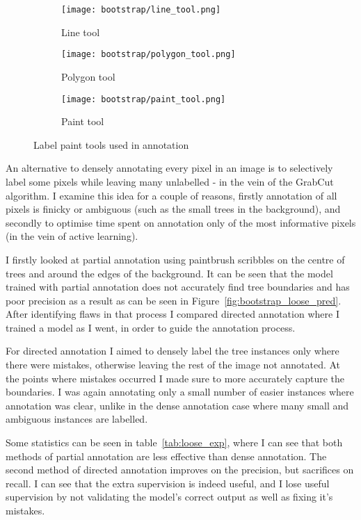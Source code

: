 \begin{figure}
\centering
\begin{subfigure}[t]{.15\textwidth}
  \centering
  \texttt{[image: bootstrap/line\_tool.png]}
  \caption{Line tool}
\end{subfigure}%
\begin{subfigure}[t]{.15\textwidth}
  \centering
  \texttt{[image: bootstrap/polygon\_tool.png]}
  \caption{Polygon tool}
\end{subfigure}%
\begin{subfigure}[t]{.15\textwidth}
  \centering
  \texttt{[image: bootstrap/paint\_tool.png]}
  \caption{Paint tool}
\end{subfigure}%

  \caption{Label paint tools used in annotation}
  \label{fig:bootstrap_tools}

\end{figure}



An alternative to densely annotating every pixel in an image is to selectively label some pixels while leaving many unlabelled - in the vein of the GrabCut algorithm. I examine this idea for a couple of reasons, firstly annotation of all pixels is finicky or ambiguous (such as the small trees in the background), and secondly to optimise time spent on annotation only of the most informative pixels (in the vein of active learning).

I firstly looked at partial annotation using paintbrush scribbles on the centre of trees and around the edges of the background. It can be seen that the model trained with partial annotation does not accurately find tree boundaries and has poor precision as a result as can be seen in Figure~\ref{fig:bootstrap_loose_pred}. After identifying flaws in that process I compared directed annotation where I trained a model as I went, in order to guide the annotation process.

For directed annotation I aimed to densely label the tree instances only where there were mistakes, otherwise leaving the rest of the image not annotated. At the points where mistakes occurred I made sure to more accurately capture the boundaries. I was again annotating only a small number of easier instances where annotation was clear, unlike in the dense annotation case where many small and ambiguous instances are labelled.

Some statistics can be seen in table~\ref{tab:loose_exp}, where I can see that both methods of partial annotation are less effective than dense annotation. The second method of directed annotation improves on the precision, but sacrifices on recall. I can see that the extra supervision is indeed useful, and I lose useful supervision by not validating the model's correct output as well as fixing it's mistakes.


